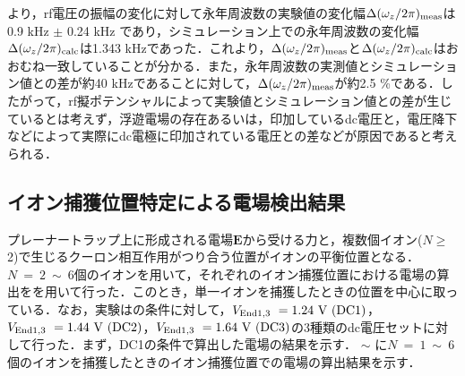 より，rf電圧の振幅の変化に対して永年周波数の実験値の変化幅$\Delta(\omega_z/2\pi)_{\rm meas}$は0.9 kHz $\pm$ 0.24 kHz であり，シミュレーション上での永年周波数の変化幅$\Delta(\omega_z/2\pi)_{\rm calc}$は1.343 kHzであった．これより，$\Delta(\omega_z/2\pi)_{\rm meas}$と$\Delta(\omega_z/2\pi)_{\rm calc}$はおおむね一致していることが分かる．また，永年周波数の実測値とシミュレーション値との差が約40 kHzであることに対して，$\Delta(\omega_z/2\pi)_{\rm meas}$が約2.5 \%である．したがって，rf擬ポテンシャルによって実験値とシミュレーション値との差が生じているとは考えず，浮遊電場の存在あるいは，印加しているdc電圧と，電圧降下などによって実際にdc電極に印加されている電圧との差などが原因であると考えられる．

\clearpage

\subsection{イオン捕獲位置特定による電場検出結果}\label{alpha_pos}
プレーナートラップ上に形成される電場$\bm{E}$から受ける力と，複数個イオン($N \geq$ 2)で生じるクーロン相互作用がつり合う位置がイオンの平衡位置となる．$N \ = \ 2 \ \sim \ 6$個のイオンを用いて，それぞれのイオン捕獲位置における電場の算出をを用いて行った．このとき，単一イオンを捕獲したときの位置を中心に取っている．なお，実験はの条件に対して，$V_{\rm End1,3} \ = 1.24 \ {\rm V} \ ({\rm DC1})$，$V_{\rm End 1,3} \ = 1.44 \ {\rm V} \ ({\rm DC2})$，$V_{\rm End 1,3} \ = 1.64 \ {\rm V} \ ({\rm DC3})$の3種類のdc電圧セットに対して行った．まず，DC1の条件で算出した電場の結果を示す． $\sim$ に$N \ = \ 1 \ \sim \ 6$個のイオンを捕獲したときのイオン捕獲位置での電場の算出結果を示す．

